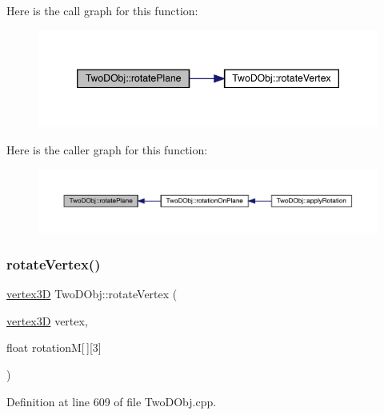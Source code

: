 Here is the call graph for this function\+:
\nopagebreak
\begin{figure}[H]
\begin{center}
\leavevmode
\includegraphics[width=346pt]{class_two_d_obj_a7981f53246124f8ca4d267a04dfd9c87_cgraph}
\end{center}
\end{figure}
Here is the caller graph for this function\+:
\nopagebreak
\begin{figure}[H]
\begin{center}
\leavevmode
\includegraphics[width=350pt]{class_two_d_obj_a7981f53246124f8ca4d267a04dfd9c87_icgraph}
\end{center}
\end{figure}
\mbox{\label{class_two_d_obj_a16583cd47ab05c87310f494ef00e16b7}} 
\subsubsection{\texorpdfstring{rotate\+Vertex()}{rotateVertex()}}
{\footnotesize\ttfamily \mbox{\hyperlink{structvertex3_d}{vertex3D}} Two\+D\+Obj\+::rotate\+Vertex (\begin{DoxyParamCaption}\item[{\mbox{\hyperlink{structvertex3_d}{vertex3D}}}]{vertex,  }\item[{float}]{rotationM\mbox{[}$\,$\mbox{]}\mbox{[}3\mbox{]} }\end{DoxyParamCaption})}



Definition at line 609 of file Two\+D\+Obj.\+cpp.

